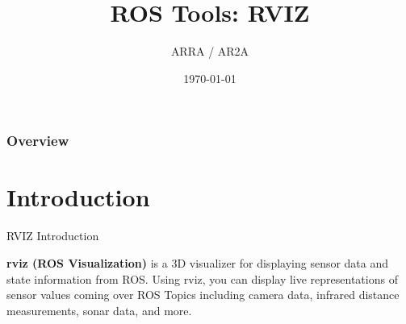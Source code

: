 \documentclass{beamer}
\title[]{ROS Tools: RVIZ} %
\author{ARRA / AR2A} %
\institute %
{
\textbf{A}dvancements for \textbf{R}obotics in \textbf{R}escue \textbf{A}pplications
}
\date{\today} %
\begin{document}
\begin{frame}
\titlepage %
\end{frame}

\begin{frame}
\frametitle{Overview} %
\tableofcontents %
\end{frame}



\section{Introduction}

\begin{frame}{RVIZ Introduction}	

	\begin{definition}
		\textbf{rviz (ROS Visualization)} is a 3D visualizer for displaying sensor data and state information from ROS. Using rviz, you can display live representations of sensor values coming over ROS Topics including camera data, infrared distance measurements, sonar data, and more. 
	
	\end{definition}
\end{frame}
\end{document}
